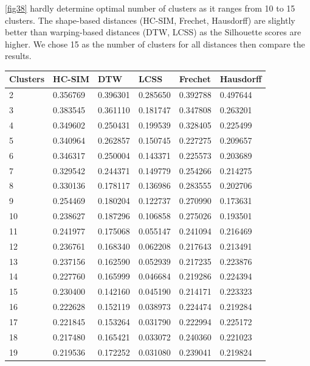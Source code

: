 \documentclass[a4paper, 12pt]{article}
\begin{document}
\autoref{fig38} hardly determine optimal number of clusters as it ranges from 10 to 15 clusters. The shape-based distances (HC-SIM, Frechet, Hausdorff) are slightly better than warping-based distances (DTW, LCSS) as the Silhouette scores are higher. We chose 15 as the number of clusters for all distances then compare the results.

\begin{tabularx}{\linewidth}{|X|X|X|X|X|X|}
    \caption{Caltrain Silhouette Scores} \\
    \hline \textbf{Clusters} & \textbf{HC-SIM} & \textbf{DTW} & \textbf{LCSS} & \textbf{Frechet} & \textbf{Hausdorff} \\
    \hline
    \hline
    2 & 0.356769 & 0.396301 & 0.285650 & 0.392788 & 0.497644 \\
    3 & 0.383545 & 0.361110 & 0.181747 & 0.347808 & 0.263201 \\
    4 & 0.349602 & 0.250431 & 0.199539 & 0.328405 & 0.225499 \\
    5 & 0.340964 & 0.262857 & 0.150745 & 0.227275 & 0.209657 \\
    6 & 0.346317 & 0.250004 & 0.143371 & 0.225573 & 0.203689 \\
    7 & 0.329542 & 0.244371 & 0.149779 & 0.254266 & 0.214275 \\
    8 & 0.330136 & 0.178117 & 0.136986 & 0.283555 & 0.202706 \\
    9 & 0.254469 & 0.180204 & 0.122737 & 0.270990 & 0.173631 \\
    10 & 0.238627 & 0.187296 & 0.106858 & 0.275026 & 0.193501 \\
    11 & 0.241977 & 0.175068 & 0.055147 & 0.241094 & 0.216469 \\
    12 & 0.236761 & 0.168340 & 0.062208 & 0.217643 & 0.213491 \\
    13 & 0.237156 & 0.162590 & 0.052939 & 0.217235 & 0.223876 \\
    14 & 0.227760 & 0.165999 & 0.046684 & 0.219286 & 0.224394 \\
    15 & 0.230400 & 0.142160 & 0.045190 & 0.214171 & 0.223323 \\
    16 & 0.222628 & 0.152119 & 0.038973 & 0.224474 & 0.219284 \\
    17 & 0.221845 & 0.153264 & 0.031790 & 0.222994 & 0.225172 \\
    18 & 0.217480 & 0.165421 & 0.033072 & 0.240360 & 0.221023 \\
    19 & 0.219536 & 0.172252 & 0.031080 & 0.239041 & 0.219824 \\

\end{tabularx}
\end{document}
